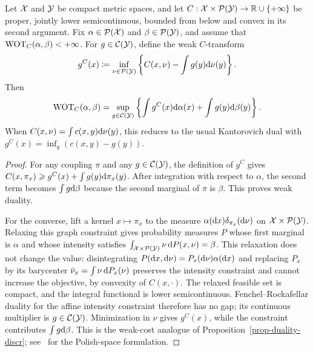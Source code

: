 \begin{prop}\label{prop-weak-ot-duality}
	Let $\mathcal{X}$ and $\mathcal{Y}$ be compact metric spaces, and let $C:\mathcal{X}\times\mathcal{P}(\mathcal{Y})\to\mathbb{R}\cup\{+\infty\}$ be proper, jointly lower semicontinuous, bounded from below and convex in its second argument. Fix $\alpha\in\mathcal{P}(\mathcal{X})$ and $\beta\in\mathcal{P}(\mathcal{Y})$, and assume that $\operatorname{WOT}_C(\alpha,\beta)<+\infty$. For $g\in\mathcal{C}(\mathcal{Y})$, define the weak $C$-transform
	\[
		g^C(x)
		\coloneqq
		\inf_{\nu\in\mathcal{P}(\mathcal{Y})}
		\left\{
			C(x,\nu)-\int g(y)\mathrm{d}\nu(y)
		\right\}.
	\]
	Then
	\[
		\operatorname{WOT}_C(\alpha,\beta)
		=
		\sup_{g\in\mathcal{C}(\mathcal{Y})}
		\left\{
			\int g^C(x)\mathrm{d}\alpha(x)+\int g(y)\mathrm{d}\beta(y)
		\right\}.
	\]
	When $C(x,\nu)=\int c(x,y)\mathrm{d}\nu(y)$, this reduces to the usual Kantorovich dual with $g^C(x)=\inf_y(c(x,y)-g(y))$.
\end{prop}

\begin{proof}
	For any coupling $\pi$ and any $g\in\mathcal{C}(\mathcal{Y})$, the definition of $g^C$ gives
	\(C(x,\pi_x)\geqslant g^C(x)+\int g(y)\mathrm{d}\pi_x(y)\).
	After integration with respect to $\alpha$, the second term becomes $\int g\mathrm{d}\beta$ because the second marginal of $\pi$ is $\beta$. This proves weak duality.

	For the converse, lift a kernel $x\mapsto\pi_x$ to the measure $\alpha(\mathrm{d} x)\delta_{\pi_x}(\mathrm{d}\nu)$ on $\mathcal{X}\times\mathcal{P}(\mathcal{Y})$. Relaxing this graph constraint gives probability measures $P$ whose first marginal is $\alpha$ and whose intensity satisfies
	\(\int_{\mathcal{X}\times\mathcal{P}(\mathcal{Y})}\nu\,\mathrm{d} P(x,\nu)=\beta\).
	This relaxation does not change the value: disintegrating $P(\mathrm{d} x,\mathrm{d}\nu)=P_x(\mathrm{d}\nu)\alpha(\mathrm{d} x)$ and replacing $P_x$ by its barycenter $\bar\nu_x=\int\nu\,\mathrm{d} P_x(\nu)$ preserves the intensity constraint and cannot increase the objective, by convexity of $C(x,\cdot)$. The relaxed feasible set is compact, and the integral functional is lower semicontinuous. Fenchel--Rockafellar duality for the affine intensity constraint therefore has no gap; its continuous multiplier is $g\in\mathcal{C}(\mathcal{Y})$. Minimization in $\nu$ gives $g^C(x)$, while the constraint contributes $\int g\mathrm{d}\beta$. This is the weak-cost analogue of Proposition~\ref{prop-duality-discr}; see~\cite{backhoff2019weak} for the Polish-space formulation.
\end{proof}

